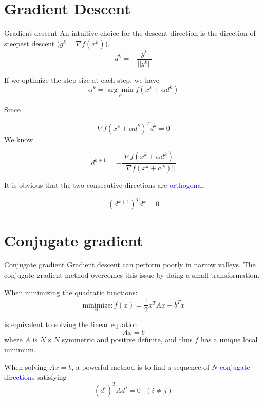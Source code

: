 \documentclass{beamer}
\begin{document}
\section{Gradient Descent}
\begin{frame}{Gradient descent}
An intuitive choice for the descent direction is the direction of steepest descent ($g^k = \nabla f(x^k)$).
\begin{equation*}
    d^k = - \frac{g^k}{||g^k||}
\end{equation*}

If we optimize the step size at each step, we have
\begin{equation*}
    \alpha^k = \underset{\alpha}{\arg \min} f(x^k + \alpha d^k)
\end{equation*}

Since 

\begin{equation*}
    \nabla f(x^k + \alpha d^k)^T d^k = 0
\end{equation*}
We know

\begin{equation*}
    d^{k+1} = - \frac{\nabla f(x^k + \alpha d^k)}{||\nabla f(x^k + \alpha^k)||}
\end{equation*}

It is obvious that the two consecutive directions are \textcolor{blue}{orthogonal}.

\begin{equation*}
	(d^{k+1})^T d^k = 0
\end{equation*}

\end{frame}

\section{Conjugate gradient}
\begin{frame}{Conjugate gradient}
Gradient descent can perform poorly in narrow valleys. The conjugate gradient method overcomes this issue by doing a small transformation.

When minimizing the quadratic functions:
\begin{equation*}
    \underset{\alpha}{\textrm{minimize}}: f(x) = \frac{1}{2} x^T A x - b^T x 
\end{equation*}

is equivalent to solving the linear equation
\begin{equation*}
    Ax = b
\end{equation*}
where $A$ is $N \times N$ symmetric and positive definite, and thus $f$ has a unique local minimum.

When solving $Ax = b$, a powerful method is to find a sequence of $N$ \textcolor{blue}{conjugate directions} satisfying 
\begin{equation*}
		(d^i)^T A d^j = 0 ~~~ (i\neq j)
\end{equation*}

\end{frame}
\end{document}
